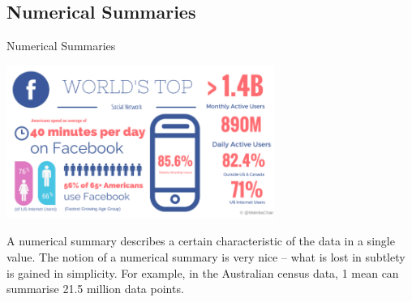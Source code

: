 \documentclass[t,xcolor=pdftex,dvipsnames,table]{beamer}\usepackage[]{graphicx}\usepackage[]{color}
\begin{document}
\subsection[]{Numerical Summaries}
\begin{frame}[fragile]{Numerical Summaries}
\begin{center}
\includegraphics[height=5cm]{../images/SocialMedia2015.png}
\end{center}

A numerical summary describes a certain characteristic of the data in a single value. The notion of a numerical summary is very nice – what is lost in subtlety is gained in simplicity.
For example, in the Australian census data, 1 mean can summarise 21.5 million data points. 
\href{https://www.linkedin.com/pulse/2015-social-media-stats-trends-images-part-1-wahiba-chair-mba}{}
\href{http:\\www.censusdata.abs.gov.au/census_services/getproduct/census/2011/quickstat/0}{}
\end{frame}
\end{document}
